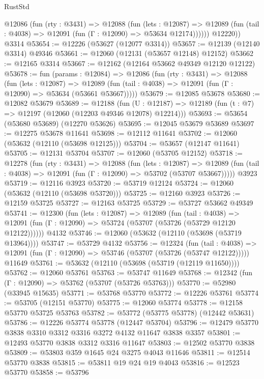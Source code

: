 \begin{lexlean}{RustStd}
\begin{coremodule}
          @12086
            (fun (rty : @3431) =>
            @12088
              (fun (lets : @12087) =>
              @12089 (fun (tail : @4038) => @12091 (fun (Γ : @12090) => @53634 @12174))))))
        @12220))
    @3314
@53654 := @12226 (@53627 (@12077 @3314))
@53657 := @12139 (@12140 @3314) @49346
@53661 := @12060 (@12131 (@53657 @12148) @12152)
@53662 := @12165 @3314
@53667 := @12162 (@12164 @53662 @49349 @12120 @12122)
@53678 := fun (params : @12084) =>
  @12086
    (fun (rty : @3431) =>
    @12088
      (fun (lets : @12087) =>
      @12089 (fun (tail : @4038) => @12091 (fun (Γ : @12090) => @53634 (@53661 @53667)))))
@53679 := @12085 @53678
@53680 := @12082 @53679
@53689 := @12188
    (fun (U : @12187) => @12189 (fun (t : @7) => @12197 (@12060 (@12203 @49346 @12078) @12214)))
@53693 := @53654 (@53680 @53689) (@12270 @53626)
@53695 := @12045 @53679 @53689
@53697 := @12275 @53678 @11641
@53698 := @12112 @11641
@53702 := @12060 (@53632 (@12110 (@53698 @12125)))
@53704 := @53657 (@12147 @11641)
@53705 := @12131 @53704
@53707 := @12060 (@53705 @12152)
@53718 := @12278
    (fun (rty : @3431) =>
    @12088
      (fun (lets : @12087) =>
      @12089 (fun (tail : @4038) => @12091 (fun (Γ : @12090) => @53702 (@53707 @53667)))))
    @3923
@53719 := @12116 @3923
@53720 := @53719 @12124
@53724 := @12060 (@53632 (@12110 (@53698 @53720)))
@53725 := @12160 @3923
@53726 := @12159 @53725
@53727 := @12163 @53725
@53729 := @53727 @53662 @49349
@53741 := @12300
    (fun (lets : @12087) =>
    @12089
      (fun (tail : @4038) =>
      @12091 (fun (Γ : @12090) => @53724 (@53707 (@53726 (@53729 @12120 @12122))))))
    @4132
@53746 := @12060 (@53632 (@12110 (@53698 (@53719 @13964))))
@53747 := @53729 @4132
@53756 := @12324
    (fun (tail : @4038) => @12091 (fun (Γ : @12090) => @53746 (@53707 (@53726 (@53747 @12122)))))
    @11649
@53761 := @53632 (@12110 (@53698 (@53719 (@12119 @11650))))
@53762 := @12060 @53761
@53763 := @53747 @11649
@53768 := @12342 (fun (Γ : @12090) => @53762 (@53707 (@53726 @53763)))
@53770 := @52980 (@33945 @15635)
@53771 := @53768 @53770
@53772 := @12226 @53761
@53774 := @53705 (@12151 @53770)
@53775 := @12060 @53774
@53778 := @12158 @53770 @53725 @53763
@53782 := @53772 (@53775 @53778) (@12442 @53631)
@53786 := @12226 @53774 @53778 (@12447 @53704)
@53796 := @12479 @53770 @3838 @3310 @3312 @3316 @3272 @4132 @11647 @3838 @3357
@53801 := @12493 @53770 @3838 @3312 @3316 @11647
@53803 := @12502 @53770 @3838
@53809 := @53803 @359 @1645 @24 @3275 @4043 @11646
@53811 := @12514 @53770 @3838
@53815 := @53811 @19 @24 @19 @4043
@53816 := @12523 @53770
@53858 := @53796

\end{coremodule}
\end{lexlean}
